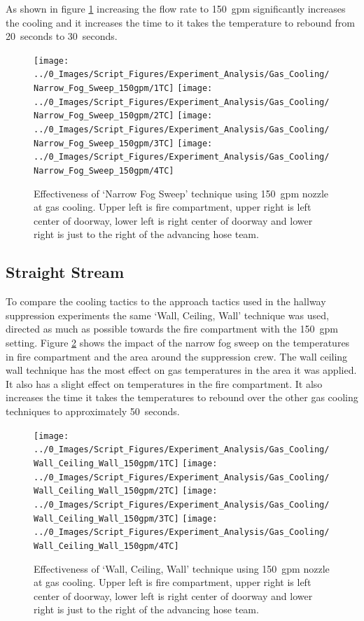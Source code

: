 \documentclass[12pt,oneside]{book}
\begin{document}
As shown in figure \ref{fig:gas_narrow_fog_150} increasing the flow rate to 150~gpm significantly increases the cooling and it increases the time to it takes the temperature to rebound from 20~seconds to 30~seconds. 

\begin{figure}[H]
\centering
\texttt{[image: ../0\_Images/Script\_Figures/Experiment\_Analysis/Gas\_Cooling/Narrow\_Fog\_Sweep\_150gpm/1TC]}
\texttt{[image: ../0\_Images/Script\_Figures/Experiment\_Analysis/Gas\_Cooling/Narrow\_Fog\_Sweep\_150gpm/2TC]}
\texttt{[image: ../0\_Images/Script\_Figures/Experiment\_Analysis/Gas\_Cooling/Narrow\_Fog\_Sweep\_150gpm/3TC]}
\texttt{[image: ../0\_Images/Script\_Figures/Experiment\_Analysis/Gas\_Cooling/Narrow\_Fog\_Sweep\_150gpm/4TC]}
\caption[Gas Cooling - Narrow Fog Sweep 150~gpm]{Effectiveness of `Narrow Fog Sweep' technique using 150~gpm nozzle at gas cooling. Upper left is fire compartment, upper right is left center of doorway, lower left is right center of doorway and lower right is just to the right of the advancing hose team.}
\label{fig:gas_narrow_fog_150}
\end{figure}

\subsection{Straight Stream}
To compare the cooling tactics to the approach tactics used in the hallway suppression experiments the same `Wall, Ceiling, Wall' technique was used, directed as much as possible towards the fire compartment with the 150~gpm setting. Figure \ref{fig:gas_wall_ceiling_wall_150} shows the impact of the narrow fog sweep on the temperatures in fire compartment and the area around the suppression crew. The wall ceiling wall technique has the most effect on gas temperatures in the area it was applied. It also has a slight effect on temperatures in the fire compartment. It also increases the time it takes the temperatures to rebound over the other gas cooling techniques to approximately 50~seconds.

\begin{figure}[H]
\centering
\texttt{[image: ../0\_Images/Script\_Figures/Experiment\_Analysis/Gas\_Cooling/Wall\_Ceiling\_Wall\_150gpm/1TC]}
\texttt{[image: ../0\_Images/Script\_Figures/Experiment\_Analysis/Gas\_Cooling/Wall\_Ceiling\_Wall\_150gpm/2TC]}
\texttt{[image: ../0\_Images/Script\_Figures/Experiment\_Analysis/Gas\_Cooling/Wall\_Ceiling\_Wall\_150gpm/3TC]}
\texttt{[image: ../0\_Images/Script\_Figures/Experiment\_Analysis/Gas\_Cooling/Wall\_Ceiling\_Wall\_150gpm/4TC]}
\caption[Gas Cooling - Straight Stream 150~gpm]{Effectiveness of `Wall, Ceiling, Wall' technique using 150~gpm nozzle at gas cooling. Upper left is fire compartment, upper right is left center of doorway, lower left is right center of doorway and lower right is just to the right of the advancing hose team.}
\label{fig:gas_wall_ceiling_wall_150}
\end{figure}
\end{document}

